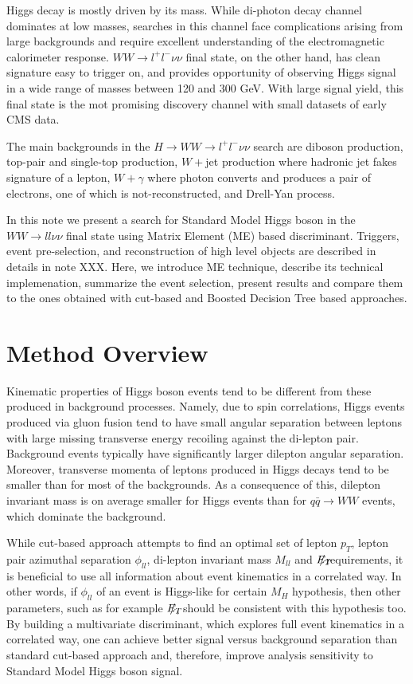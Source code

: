 \documentclass{cmspaper}
\newcommand{\met}{\mbox{$E_T\hspace{-1.1em}/$\hspace{0.7em}}}
\begin{document}
Higgs decay is mostly driven by its mass. While di-photon decay channel dominates at low masses, searches in this channel face  
complications arising from large backgrounds and require excellent understanding of the electromagnetic calorimeter response. 
$WW \rightarrow l^{+}l^{-}\nu\nu$ final state, on the other hand, has clean signature easy to trigger on, and provides opportunity of observing
Higgs signal in a wide range of masses between 120 and 300 GeV. With large signal yield, this final state is the mot promising
discovery channel with small datasets of early CMS data. 

The main backgrounds in the $H \rightarrow WW \rightarrow l^{+}l^{-}\nu\nu$ search are diboson production, top-pair and single-top production,
$W+$jet production where hadronic jet fakes signature of a lepton, $W+\gamma$ where photon converts and produces a pair of electrons, one
of which is not-reconstructed, and Drell-Yan process.

In this note we present a search for Standard Model Higgs boson in the $WW \rightarrow ll\nu\nu$ final state 
using Matrix Element (ME) based discriminant. Triggers, event pre-selection, and reconstruction of high level objects are described 
in details in note XXX. Here, we introduce ME technique, describe its technical implemenation, summarize the event selection, 
present results and compare them to the ones obtained with cut-based and Boosted Decision Tree based approaches.

\section{Method Overview}
Kinematic properties of Higgs boson events tend to be different from these produced in background processes. Namely, due to spin correlations,
Higgs events produced via gluon fusion tend to have small angular separation between leptons with large missing transverse energy recoiling
against the di-lepton pair. Background events typically have significantly larger dilepton angular separation.  Moreover, 
transverse momenta of leptons produced in Higgs decays tend to be smaller than for most of the backgrounds. As a consequence of this,
dilepton invariant mass is on average smaller for Higgs events than for $q\bar{q} \rightarrow WW$ events, which dominate the background.

While cut-based approach attempts to find an optimal set of lepton $p_{T}$, lepton pair azimuthal separation $\phi_{ll}$, 
di-lepton invariant mass  $M_{ll}$ and \met requirements, it is beneficial to use all information about event kinematics in a correlated way. 
In other words, if $\phi_{ll}$ of an event is Higgs-like for certain $M_{H}$ hypothesis, then other parameters, such as for example 
\met, should be consistent with this hypothesis too. By building a multivariate discriminant, which explores full event kinematics in a 
correlated way, one can achieve better signal versus background separation than standard cut-based approach and, 
therefore, improve analysis sensitivity to Standard Model Higgs boson signal.
\end{document}
